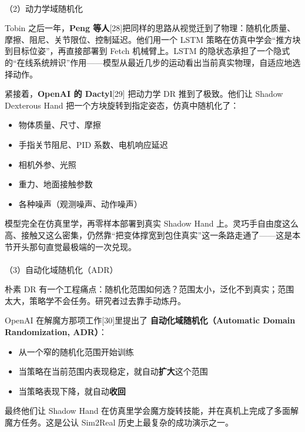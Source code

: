 \documentclass[
  chinese,
]{ctexart}
\makeatletter
\let\oldparagraph\paragraph
\renewcommand{\paragraph}{
    \@ifstar
      \xxxParagraphStar
      \xxxParagraphNoStar
  }
\newcommand{\xxxParagraphStar}[1]{\oldparagraph*{#1}\mbox{}}
\newcommand{\xxxParagraphNoStar}[1]{\oldparagraph{#1}\mbox{}}
\providecommand{\tightlist}{%
  \setlength{\itemsep}{0pt}\setlength{\parskip}{0pt}}
\makeatother
\begin{document}
\paragraph{（2）动力学域随机化}\label{ux52a8ux529bux5b66ux57dfux968fux673aux5316}

Tobin 之后一年，\textbf{Peng
等人}{[}28{]}把同样的思路从视觉迁到了物理：随机化质量、摩擦、阻尼、关节限位、控制延迟。他们用一个
LSTM 策略在仿真中学会``推方块到目标位姿''，再直接部署到 Fetch
机械臂上。LSTM
的隐状态承担了一个隐式的``在线系统辨识''作用------模型从最近几步的运动看出当前真实物理，自适应地选择动作。

紧接着，\textbf{OpenAI 的 Dactyl}{[}29{]} 把动力学 DR 推到了极致。他们让
Shadow Dexterous Hand 把一个方块旋转到指定姿态，仿真中随机化了：

\begin{itemize}
\tightlist
\item
  物体质量、尺寸、摩擦
\item
  手指关节阻尼、PID 系数、电机响应延迟
\item
  相机外参、光照
\item
  重力、地面接触参数
\item
  各种噪声（观测噪声、动作噪声）
\end{itemize}

模型完全在仿真里学，再零样本部署到真实 Shadow Hand
上。灵巧手自由度这么高、接触又这么密集，仍然靠``把变体撑宽到包住真实''这一条路走通了------这是本节开头那句直觉最极端的一次兑现。

\paragraph{（3）自动化域随机化（ADR）}\label{ux81eaux52a8ux5316ux57dfux968fux673aux5316adr}

朴素 DR
有一个工程痛点：随机化范围如何选？范围太小，泛化不到真实；范围太大，策略学不会任务。研究者过去靠手动炼丹。

OpenAI 在解魔方那项工作{[}30{]}里提出了
\textbf{自动化域随机化（Automatic Domain Randomization, ADR）}：

\begin{itemize}
\tightlist
\item
  从一个窄的随机化范围开始训练
\item
  当策略在当前范围内表现稳定，就自动\textbf{扩大}这个范围
\item
  当策略表现下降，就自动\textbf{收回}
\end{itemize}

最终他们让 Shadow Hand
在仿真里学会魔方旋转技能，并在真机上完成了多面解魔方任务。这是公认
Sim2Real 历史上最复杂的成功演示之一。
\end{document}

